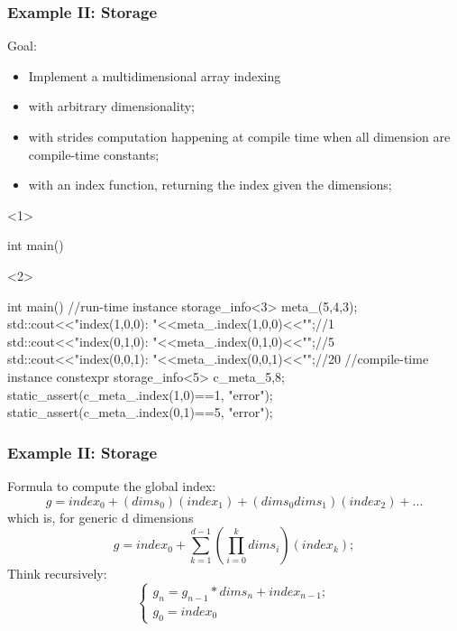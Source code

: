 \documentclass[aspectratio=43]{beamer}
\begin{document}
\begin{frame}[fragile]\frametitle{Example II: Storage}
  Goal:
  \begin{itemize}
  \item Implement a multidimensional array indexing
  \item with arbitrary dimensionality;
  \item with strides computation happening at compile time when all dimension are compile-time constants;
  \item with an index function, returning the index given the dimensions;
  \end{itemize}

  \begin{onlyenv}<1>
    \begin{Cpplisting}{}
int main(){









}
    \end{Cpplisting}
  \end{onlyenv}
  \begin{onlyenv}<2>
  \begin{Cpplisting}{}
int main(){
  //run-time instance
  storage_info<3> meta_(5,4,3);
  std::cout<<"index(1,0,0): "<<meta_.index(1,0,0)<<"\n";//1
  std::cout<<"index(0,1,0): "<<meta_.index(0,1,0)<<"\n";//5
  std::cout<<"index(0,0,1): "<<meta_.index(0,0,1)<<"\n";//20
  //compile-time instance
  constexpr storage_info<5> c_meta_{5,8};
  static_assert(c_meta_.index(1,0)==1, "error");
  static_assert(c_meta_.index(0,1)==5, "error");
}
    \end{Cpplisting}
  \end{onlyenv}
\end{frame}


\begin{frame}[fragile]\frametitle{Example II: Storage}
  Formula to compute the global index:
  $$
  g = index_0 + (dims_0)(index_1) + (dims_0dims_1)(index_2) + ...
  $$
  which is, for generic d dimensions
  $$
  g = index_0 + \sum_{k=1}^{d-1}\left(\prod_{i=0}^kdims_i\right)(index_{k});
  $$
  Think recursively:
  $$
    \left\{
  \begin{array}{l}
      g_n = g_{n-1} * dims_n + index_{n-1};\\
      g_0 = index_0
  \end{array}
  \right.
  $$


\end{frame}
\end{document}
